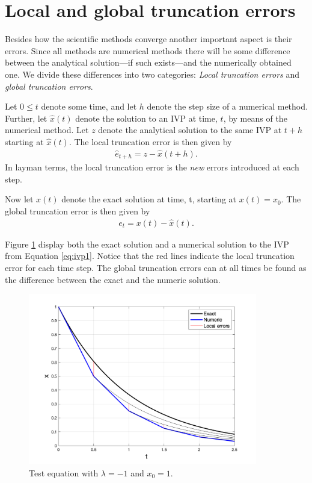 \section{Local and global truncation errors}
Besides how the scientific methods converge another important aspect is their errors. Since all methods are numerical methods there will be some difference between the analytical solution---if such exists---and the numerically obtained one. We divide these differences into two categories: \textit{Local truncation errors} and \textit{global truncation errors}. 

Let $0 \leq t$ denote some time, and let $h$ denote the step size of a numerical method. Further, let $\hat{x}(t)$ denote the solution to an IVP at time, $t$, by means of the numerical method. Let $z$ denote the analytical solution to the same IVP at $t+h$ starting at $\hat{x}(t)$. The local truncation error is then given by
\begin{align}
    \hat{e}_{t+h} = z - \hat{x}(t+h).
\end{align}
In layman terms, the local truncation error is the \textit{new} errors introduced at each step. 

Now let $x(t)$ denote the exact solution at time, t, starting at $x(t) = x_0$. The global truncation error is then given by
\begin{align}
    e_t = x(t)-\hat{x}(t).
\end{align}

Figure \ref{fig1:local_err0} display both the exact solution and a numerical solution to the IVP from Equation \ref{eq:ivp1}. Notice that the red lines indicate the local truncation error for each time step. The global truncation errors can at all times be found as the difference between the exact and the numeric solution.
\begin{figure}[H]
    \centering
    \includegraphics[width=10cm]{graphics/opg1/local_err0.png}
    \caption{Test equation with $\lambda=-1$ and $x_0=1$.}
    \label{fig1:local_err0}
\end{figure}


